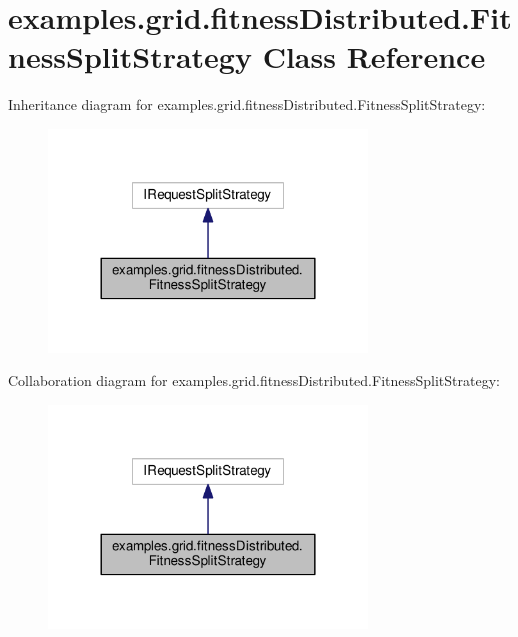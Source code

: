 \hypertarget{classexamples_1_1grid_1_1fitness_distributed_1_1_fitness_split_strategy}{\section{examples.\-grid.\-fitness\-Distributed.\-Fitness\-Split\-Strategy Class Reference}
\label{classexamples_1_1grid_1_1fitness_distributed_1_1_fitness_split_strategy}
}


Inheritance diagram for examples.\-grid.\-fitness\-Distributed.\-Fitness\-Split\-Strategy\-:
\nopagebreak
\begin{figure}[H]
\begin{center}
\leavevmode
\includegraphics[width=240pt]{classexamples_1_1grid_1_1fitness_distributed_1_1_fitness_split_strategy__inherit__graph}
\end{center}
\end{figure}


Collaboration diagram for examples.\-grid.\-fitness\-Distributed.\-Fitness\-Split\-Strategy\-:
\nopagebreak
\begin{figure}[H]
\begin{center}
\leavevmode
\includegraphics[width=240pt]{classexamples_1_1grid_1_1fitness_distributed_1_1_fitness_split_strategy__coll__graph}
\end{center}
\end{figure}
